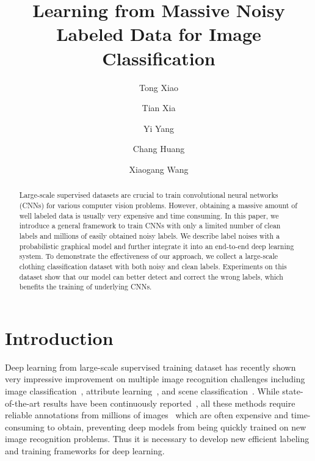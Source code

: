 \documentclass[10pt,twocolumn,letterpaper]{article}
\begin{document}
\title{Learning from Massive Noisy Labeled Data for Image Classification}
\author[1]{Tong Xiao}
\author[2]{Tian Xia}
\author[2]{Yi Yang}
\author[2]{Chang Huang}
\author[1]{Xiaogang Wang}
\renewcommand\Authands{, and }


\maketitle
\thispagestyle{empty}

\begin{abstract}
Large-scale supervised datasets are crucial to train convolutional neural networks (CNNs) for various computer vision problems. However, obtaining a massive amount of well labeled data is usually very expensive and time consuming. In this paper, we introduce a general framework to train CNNs with only a limited number of clean labels and millions of easily obtained noisy labels. We describe label noises with a probabilistic graphical model and further integrate it into an end-to-end deep learning system. To demonstrate the effectiveness of our approach, we collect a large-scale clothing classification dataset with both noisy and clean labels. Experiments on this dataset show that our model can better detect and correct the wrong labels, which benefits the training of underlying CNNs.
\end{abstract}

\section{Introduction} %
\label{sec:introduction}

Deep learning from large-scale supervised training dataset has recently shown very impressive improvement on multiple image recognition challenges including image classification~\cite{krizhevsky2012imagenet}, attribute learning~\cite{zhang2014panda}, and scene classification~\cite{farabet2013learning}. While state-of-the-art results have been continuously reported~\cite{zeiler2013visualizing,simonyan2014very,szegedy2014going}, all these methods require reliable annotations from millions of images~\cite{deng2009imagenet} which are often expensive and time-consuming to obtain, preventing deep models from being quickly trained on new image recognition problems. Thus it is necessary to develop new efficient labeling and training frameworks for deep learning.
\end{document}
